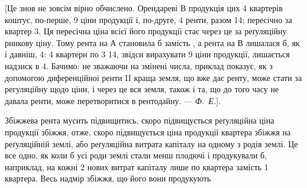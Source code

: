 [Це знов не зовсім вірно обчислено. Орендареві $В$ продукція цих 4 квартерів
коштує, по-перше, 9 ціни продукції і, по-друге,
4 ренти, разом 14; пересічно за квартер 3.
Ця пересічна ціна всієї його продукції стає через це за реґуляційну ринкову ціну. Тому рента на
$А$ становила б  замість , а рента на $В$ лишалася б, як і давніш, 4: 4 квартерн по 3 \deq{} 14, звідси вирахувати
9 ціни продукції, лишається надзиск в 4. Бачимо: не
зважаючи на змінені числа, приклад показує, як з допомогою диференційноі
ренти II краща земля, що вже дає ренту, може стати за регуляційну щодо ціни,
і через це вся земля, також і та, що до того часу не давала ренти, може перетворитися
в рентодайну. — \emph{Ф.~Е.}].

Збіжжева рента мусить підвищитись, скоро підвищується реґуляційна
ціна продукції збіжжя, отже, скоро підвищується ціна продукції квартера збіжжя
на реґуляційній землі, або реґуляційна витрата капіталу на одному з родів
землі. Це все одно, як коли б усі роди землі стали менш плодючі і продукували
б, наприклад, на кожні 2 нових витрат капіталу лише по 
квартера замість 1 квартера. Весь надмір збіжжя, що його вони продукують
\parbreak{}  %
